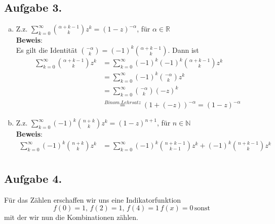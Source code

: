 \documentclass[11pt,a4paper,ngerman]{article}
\begin{document}
\subsection*{Aufgabe 3.}

\begin{enumerate}[a)]
\item Z.z. $ \sum_{k=0}^\infty \binom{\alpha +k -1}{k} z^k = (1-z)^{-\alpha} $, für $\alpha \in \mathbb{R}$ \\

\textbf{Beweis}: \\
Es gilt die Identität $\binom{-\alpha}{k} = (-1)^k \binom{\alpha + k -1}{k}$. Dann ist
\begin{equation*}\begin{split}
\sum_{k=0}^\infty \binom{\alpha +k -1}{k} z^k
&= \sum_{k=0}^\infty (-1)^k (-1)^k \binom{\alpha +k -1}{k} z^k \\
&= \sum_{k=0}^\infty (-1)^k \binom{-\alpha}{k} z^k \\
&= \sum_{k=0}^\infty \binom{-\alpha}{k} (-z)^k \\
&\stackrel{Binom.Lehrsatz}{=} (1 + (-z))^{-\alpha} = (1 - z)^{-\alpha}
\end{split}\end{equation*}
\item Z.z. $\sum_{k=0}^\infty (-1)^k \binom{n+k}{k} z^k = (1-z)^{n+1}$, für $n \in \mathbb{N}$ \\

\textbf{Beweis}:
\begin{equation*}\begin{split}
\sum_{k=0}^\infty (-1)^k \binom{n+k}{k} z^k 
&= \sum_{k=0}^\infty (-1)^k \binom{n+k-1}{k-1} z^k + (-1)^k \binom{n+k-1}{k} z^k \\
\end{split}\end{equation*}

\end{enumerate}

\subsection*{Aufgabe 4.}

Für das Zählen erschaffen wir uns eine Indikatorfunktion
$$
    f(0) = 1, \, f(2) = 1, \, f(4) = 1 \, f(x) = 0 \, \text{sonst}
$$
mit der wir nun die Kombinationen zählen.
\end{document}
